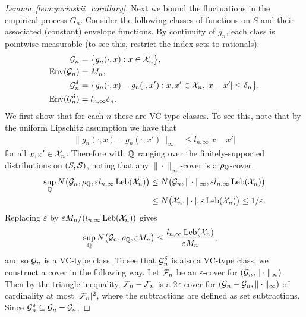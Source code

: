 \begin{proof}[Lemma~\ref{lem:yurinskii_corollary}]
  Next we bound the fluctuations in
  the empirical process $G_n$.
  Consider the following classes of functions on $S$
  and their associated (constant) envelope functions.
  By continuity of $g_n$,
  each class is pointwise measurable
  (to see this, restrict the index sets to rationals).
  \begin{align*}
    \mathcal{G}_n
    &=
    \big\{
      g_n(\cdot, x):
      x \in \mathcal{X}_n
    \big\}, \\
    \operatorname{Env}(\mathcal{G}_n)
    &=
    M_n, \\
    \mathcal{G}_n^\delta
    &=
    \big\{
      g_n(\cdot, x)
      - g_n(\cdot, x'):
      x, x' \in \mathcal{X}_n,
      |x-x'| \leq \delta_n
    \big\}, \\
    \operatorname{Env}(\mathcal{G}_n^\delta)
    &=
    l_{n,\infty} \delta_n.
  \end{align*}
  We first show that
  for each $n$
  these are VC-type classes.
  To see this,
  note that by the uniform Lipschitz assumption
  we have that
  \begin{align*}
    \big\|
    g_n(\cdot, x)
    - g_n(\cdot, x')
    \big\|_\infty
    &\leq l_{n,\infty} |x-x'|
  \end{align*}
  for all $x,x' \in \mathcal{X}_n$.
  Therefore with $\mathbb{Q}$ ranging over the
  finitely-supported distributions
  on $(S, \mathcal{S})$,
  noting that any $\|\cdot\|_\infty$-cover
  is a $\rho_{\mathbb{Q}}$-cover,
  \begin{align*}
    \sup_{\mathbb{Q}}
    N\big(\mathcal{G}_n, \rho_{\mathbb{Q}}, \varepsilon l_{n,\infty} \operatorname{Leb}(\mathcal{X}_n)\big)
    &\leq
    N\big(\mathcal{G}_n, \|\cdot\|_\infty,
    \varepsilon l_{n,\infty} \operatorname{Leb}(\mathcal{X}_n)\big) \\
    &\leq
    N\big(\mathcal{X}_n, |\cdot|, \varepsilon \operatorname{Leb}(\mathcal{X}_n)\big)
    \leq
    1/\varepsilon.
  \end{align*}
  Replacing $\varepsilon$ by
  $\varepsilon M_n/(l_{n,\infty} \operatorname{Leb}(\mathcal{X}_n))$
  gives
  \begin{align*}
    \sup_{\mathbb{Q}}
    N\big(\mathcal{G}_n, \rho_{\mathbb{Q}}, \varepsilon M_n \big)
    &\leq
    \frac{l_{n,\infty} \operatorname{Leb}(\mathcal{X}_n)}{\varepsilon M_n},
  \end{align*}
  and so $\mathcal{G}_n$
  is a VC-type class.
  To see that $\mathcal{G}_n^\delta$
  is also a VC-type class,
  we construct a cover in the following way.
  Let $\mathcal{F}_n$ be an $\varepsilon$-cover
  for $(\mathcal{G}_n, \|\cdot\|_\infty)$.
  Then by the triangle inequality,
  $\mathcal{F}_n - \mathcal{F}_n$ is a $2\varepsilon$-cover
  for $(\mathcal{G}_n - \mathcal{G}_n, \|\cdot\|_\infty)$
  of cardinality at most $|\mathcal{F}_n|^2$,
  where the subtractions are defined as set subtractions.
  Since $\mathcal{G}_n^\delta \subseteq \mathcal{G}_n - \mathcal{G}_n$,

\end{proof}
